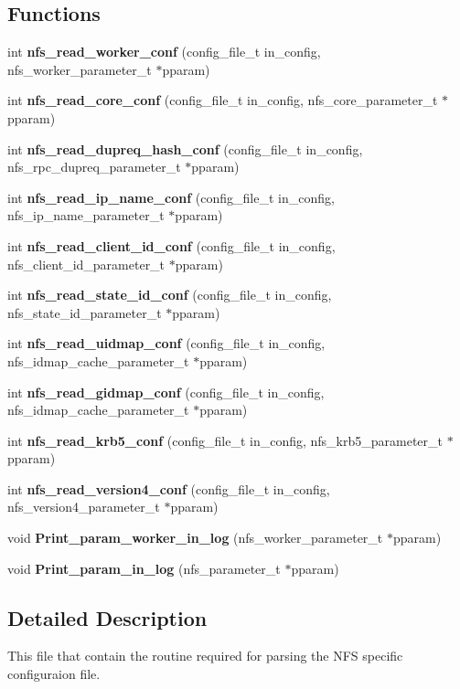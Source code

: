 \subsection*{Functions}
\begin{CompactItemize}
\item 
int {\bf nfs\_\-read\_\-worker\_\-conf} (config\_\-file\_\-t in\_\-config, nfs\_\-worker\_\-parameter\_\-t $\ast$pparam)
\item 
int {\bf nfs\_\-read\_\-core\_\-conf} (config\_\-file\_\-t in\_\-config, nfs\_\-core\_\-parameter\_\-t $\ast$pparam)
\item 
int {\bf nfs\_\-read\_\-dupreq\_\-hash\_\-conf} (config\_\-file\_\-t in\_\-config, nfs\_\-rpc\_\-dupreq\_\-parameter\_\-t $\ast$pparam)
\item 
int {\bf nfs\_\-read\_\-ip\_\-name\_\-conf} (config\_\-file\_\-t in\_\-config, nfs\_\-ip\_\-name\_\-parameter\_\-t $\ast$pparam)
\item 
int {\bf nfs\_\-read\_\-client\_\-id\_\-conf} (config\_\-file\_\-t in\_\-config, nfs\_\-client\_\-id\_\-parameter\_\-t $\ast$pparam)
\item 
int {\bf nfs\_\-read\_\-state\_\-id\_\-conf} (config\_\-file\_\-t in\_\-config, nfs\_\-state\_\-id\_\-parameter\_\-t $\ast$pparam)
\item 
int {\bf nfs\_\-read\_\-uidmap\_\-conf} (config\_\-file\_\-t in\_\-config, nfs\_\-idmap\_\-cache\_\-parameter\_\-t $\ast$pparam)
\item 
int {\bf nfs\_\-read\_\-gidmap\_\-conf} (config\_\-file\_\-t in\_\-config, nfs\_\-idmap\_\-cache\_\-parameter\_\-t $\ast$pparam)
\item 
int {\bf nfs\_\-read\_\-krb5\_\-conf} (config\_\-file\_\-t in\_\-config, nfs\_\-krb5\_\-parameter\_\-t $\ast$pparam)
\item 
int {\bf nfs\_\-read\_\-version4\_\-conf} (config\_\-file\_\-t in\_\-config, nfs\_\-version4\_\-parameter\_\-t $\ast$pparam)
\item 
void {\bf Print\_\-param\_\-worker\_\-in\_\-log} (nfs\_\-worker\_\-parameter\_\-t $\ast$pparam)
\item 
void {\bf Print\_\-param\_\-in\_\-log} (nfs\_\-parameter\_\-t $\ast$pparam)
\end{CompactItemize}


\subsection{Detailed Description}
This file that contain the routine required for parsing the NFS specific configuraion file. 

